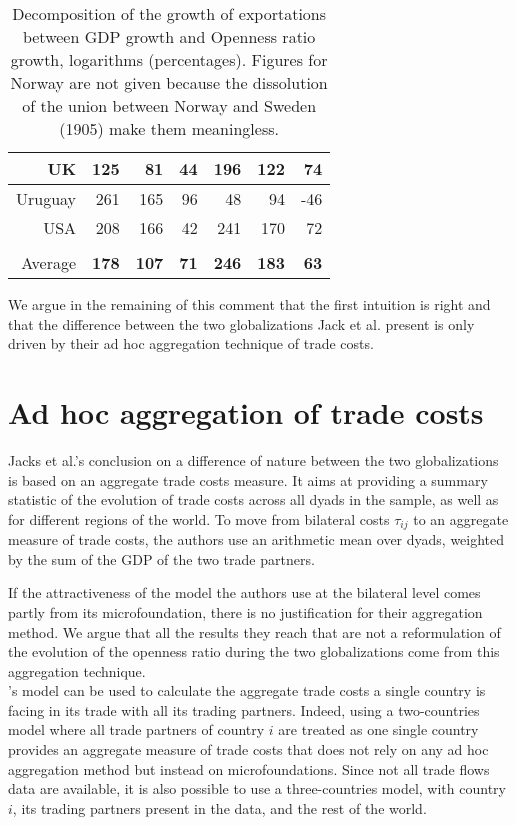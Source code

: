 \documentclass{article}
\begin{document}
\begin{table}
\begin{tabular}{|r|r|r|r|r|r|r|}
\hline
UK & 125 & 81 & 44 & 196 & 122 & 74\\
\hline
Uruguay & 261 & 165 & 96 & 48 & 94 & -46\\
\hline
USA & 208 & 166 & 42 & 241 & 170 & 72\\
\hline
 &  &  &  &  &  & \\
\hline
Average & \textbf{178} & \textbf{107} & \textbf{71} & \textbf{246} & \textbf{183} & \textbf{63}\\
\hline
\end{tabular}
\caption{Decomposition of the growth of exportations between
GDP growth and Openness ratio growth, logarithms (percentages).
Figures for Norway are not given because the dissolution of the
union between Norway and Sweden (1905) make them
meaningless.}\label{OR}
\end{table}

We argue in the remaining of this comment that the first
intuition is right and that the difference between the two
globalizations Jack et al. present is only driven by their ad
hoc aggregation technique of trade costs.

\section{\label{2} Ad hoc aggregation of trade costs}

Jacks et al.'s conclusion on a difference of nature between the
two globalizations is based on an aggregate trade costs
measure. It aims at providing a summary statistic of the
evolution of trade costs across all dyads in the sample, as
well as for different regions of the world. To move from
bilateral costs $\tau_{ij}$ to an aggregate measure of trade
costs, the authors use an arithmetic mean over dyads, weighted
by the sum of the GDP of the two trade partners.

If the attractiveness of the model the authors use at the
bilateral level comes partly from its microfoundation, there is
no justification for their aggregation method. We argue that
all the results they reach that are not a reformulation of the
evolution of the openness ratio during the two
globalizations come from this aggregation technique.\\

\cite{AW2003}'s model can be used to calculate the aggregate
trade costs a single country is facing in its trade with all
its trading partners. Indeed, using a two-countries model where
all trade partners of country $i$ are treated as one single
country provides an aggregate measure of trade costs that does
not rely on any ad hoc aggregation method but instead on
microfoundations. Since not all trade flows data are available,
it is also possible to use a three-countries model, with
country $i$, its trading partners present in the data, and the
rest of the world.
\end{document}
